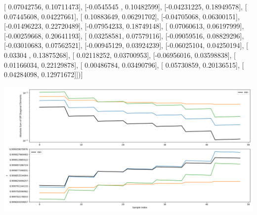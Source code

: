 \documentclass{article}
\begin{document}
       [ 0.07042756,  0.10711473],
       [-0.0545545 ,  0.10482599],
       [-0.04231225,  0.18949578],
       [ 0.07445608,  0.04227661],
       [ 0.10883649,  0.06291702],
       [-0.04705068,  0.06300151],
       [-0.01496223,  0.22720489],
       [-0.07954233,  0.18749148],
       [ 0.07060613,  0.06197999],
       [-0.00259668,  0.20641193],
       [ 0.03258581,  0.07579116],
       [-0.09059516,  0.08829296],
       [-0.03010683,  0.07562521],
       [-0.00945129,  0.03924239],
       [-0.06025104,  0.04250194],
       [ 0.03304   ,  0.13875268],
       [ 0.02118252,  0.03700953],
       [-0.06956016,  0.03598838],
       [ 0.01166034,  0.22129878],
       [ 0.00486784,  0.03490796],
       [ 0.05730859,  0.20136515],
       [ 0.04284098,  0.12971672]])]
\begin{center}
\includegraphics[scale=.9]{report_pickled_controls136/control_dpn_all.png}

\end{center}
\end{document}
